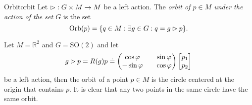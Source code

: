 \begin{definition}{Orbit}{orbit}
    Let \(\mathbin{\vartriangleright} : G \times M \to M\) be a left action. The \emph{orbit of \(p \in M\) under the action of the set \(G\)} is the set
    \begin{equation*}
        \operatorname{Orb}(p) = \{q \in M : \exists g \in G : q =  g \mathbin{\vartriangleright} p \}.
    \end{equation*}
\end{definition}
\begin{example}
    Let \(M = \mathbb{R}^2\) and \(G = \mathrm{SO}(2)\) and let
    \begin{equation*}
        g \mathbin{\vartriangleright} p = R(g)p \doteq \begin{pmatrix}
            \cos \varphi && \sin \varphi\\
            -\sin \varphi && \cos \varphi
            \end{pmatrix} \begin{bmatrix}
            p_1 \\ p_2
        \end{bmatrix}
    \end{equation*}
    be a left action, then the orbit of a point \(p \in M\) is the circle centered at the origin that contains \(p\). It is clear that any two points in the same circle have the same orbit.
\end{example}

